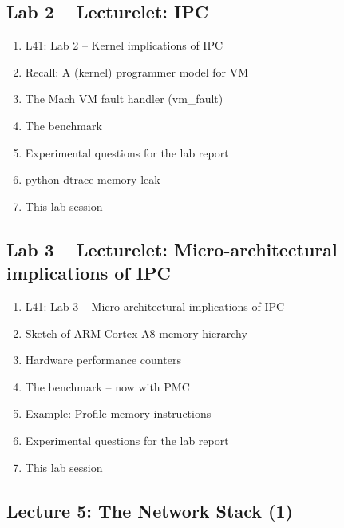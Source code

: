 \documentclass[a4paper,10pt]{article}
\begin{document}
\subsection*{Lab 2 -- Lecturelet: IPC}

\begin{enumerate}
  \item L41: Lab 2 -- Kernel implications of IPC
  \item Recall: A (kernel) programmer model for VM
  \item The Mach VM fault handler (vm\_fault)
  \item The benchmark
  \item Experimental questions for the lab report
  \item python-dtrace memory leak
  \item This lab session
\end{enumerate}

\subsection*{Lab 3 -- Lecturelet: Micro-architectural implications of IPC}

\begin{enumerate}
  \item L41: Lab 3 -- Micro-architectural implications of IPC
  \item Sketch of ARM Cortex A8 memory hierarchy
  \item Hardware performance counters
  \item The benchmark -- now with PMC
  \item Example: Profile memory instructions
  \item Experimental questions for the lab report
  \item This lab session
\end{enumerate}

\subsection*{Lecture 5: The Network Stack (1)}
\end{document}

